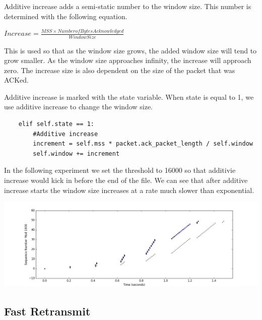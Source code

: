 \documentclass[11pt]{article}
\begin{document}
Additive increase adds a semi-static number to the window size. This number is determined with the following equation.

\vspace{5mm}
\(Increase = \frac{MSS \times Number of Bytes Acknowledged}{Window Size}\)
\vspace{5mm}

This is used so that as the window size grows, the added window size will tend to grow smaller. As the window size approaches infinity, the increase will approach zero. The increase size is also dependent on the size of the packet that was ACKed.\par

Additive increase is marked with the state variable. When state is equal to 1, we use additive increase to change the window size.

\vspace{5mm}

\begin{lstlisting}
    elif self.state == 1:
        #Additive increase
        increment = self.mss * packet.ack_packet_length / self.window
        self.window += increment
\end{lstlisting}

\vspace{5mm}

In the following experiment we set the threshold to 16000 so that additivie increase would kick in before the end of the file. We can see that after additive increase starts the window size increases at a rate much slower than exponential.

\vspace{5mm}

\includegraphics[width=17cm]{charts/additiveincrease.png}

\vspace{5mm}

\subsection{Fast Retransmit}
\end{document}
